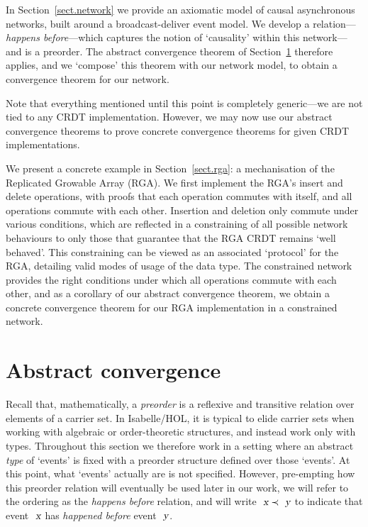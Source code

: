 \documentclass[acmlarge,review,anonymous]{acmart}\settopmatter{printfolios=true}
\begin{document}
In Section~\ref{sect.network} we provide an axiomatic model of causal asynchronous networks, built around a broadcast-deliver event model.
We develop a relation---\emph{happens before}---which captures the notion of `causality' within this network---and is a preorder.
The abstract convergence theorem of Section~\ref{sect.abstract.convergence} therefore applies, and we `compose' this theorem with our network model, to obtain a convergence theorem for our network.

Note that everything mentioned until this point is completely generic---we are not tied to any CRDT implementation.
However, we may now use our abstract convergence theorems to prove concrete convergence theorems for given CRDT implementations.

We present a concrete example in Section~\ref{sect.rga}: a mechanisation of the Replicated Growable Array (RGA).
We first implement the RGA's insert and delete operations, with proofs that each operation commutes with itself, and all operations commute with each other.
Insertion and deletion only commute under various conditions, which are reflected in a constraining of all possible network behaviours to only those that guarantee that the RGA CRDT remains `well behaved'.
This constraining can be viewed as an associated `protocol' for the RGA, detailing valid modes of usage of the data type.
The constrained network provides the right conditions under which all operations commute with each other, and as a corollary of our abstract convergence theorem, we obtain a concrete convergence theorem for our RGA implementation in a constrained network.


\section{Abstract convergence}
\label{sect.abstract.convergence}

Recall that, mathematically, a \emph{preorder} is a reflexive and transitive relation over elements of a carrier set.
In Isabelle/HOL, it is typical to elide carrier sets when working with algebraic or order-theoretic structures, and instead work only with types.
Throughout this section we therefore work in a setting where an abstract \emph{type} of `events' is fixed with a preorder structure defined over those `events'.
At this point, what `events' actually are is not specified.
However, pre-empting how this preorder relation will eventually be used later in our work, we will refer to the ordering as the \emph{happens before} relation, and will write $\isa{x} \prec \isa{y}$ to indicate that event $\isa{x}$ has \emph{happened before} event $\isa{y}$.
\end{document}
